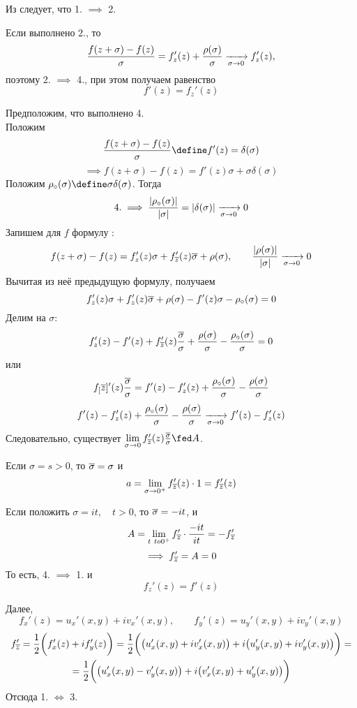 \begin{iproof}
	\item Из  следует, что 1. $ \implies $ 2.
	\item Если выполнено 2., то
	$$ \frac{f(z + \sigma) - f(z)}\sigma = f_z'(z) + \frac{\rho(\sigma)}\sigma \xrightarrow[\sigma \to 0]{} f_z'(z), $$
	поэтому 2. $ \implies $ 4., при этом получаем равенство
	$$ f'(z) = f_z'(z) $$
	\item Предположим, что выполнено 4. \\
	Положим
	$$ \frac{f(z + \sigma) - f(z)}\sigma \define f'(z) = \delta(\sigma) $$
	$$ \implies f(z + \sigma) - f(z) = f'(z) \sigma + \sigma \delta(\sigma) $$
	Положим $ \rho_\circ(\sigma) \define \sigma\delta(\sigma) $. Тогда
	$$ 4. \implies \frac{|\rho_\circ(\sigma)|}{|\sigma|} = |\delta(\sigma)| \xrightarrow[\sigma \to 0]{} 0 $$
	Запишем для $ f $ формулу :
	$$ f(z + \sigma) - f(z) = f_z'(z)\sigma + f_{\overline z}'(z) \overline \sigma + \rho(\sigma), \qquad \frac{|\rho(\sigma)|}{|\sigma|} \xrightarrow[\sigma \to 0]{} 0 $$
	Вычитая из неё предыдущую формулу, получаем
	$$ f_z'(z) \sigma + f_z' (z) \overline \sigma + \rho(\sigma) - f'(z)\sigma - \rho_\circ(\sigma) = 0 $$
	Делим на $ \sigma $:
	$$ f_z'(z) - f'(z) + f_{\overline z}'(z) \frac{\overline \sigma}\sigma + \frac{\rho(\sigma)}\sigma - \frac{\rho_\circ(\sigma)}\sigma = 0 $$
	или
	$$ f_[\overline z]'(z) \frac{\overline \sigma}\sigma = f'(z) - f_z'(z) + \frac{\rho_\circ(\sigma)}\sigma - \frac{\rho(\sigma)}\sigma $$
	$$ f'(z) - f_z'(z) + \frac{\rho_\circ(\sigma)}\sigma - \frac{\rho(\sigma)}\sigma \xrightarrow[\sigma \to 0]{} f'(z) - f_z'(z) $$
	Следовательно, существует $ \limz\sigma f_{\ol z}'(z) \frac{\ol \sigma}\sigma \fed A $.

	Если $ \sigma = s > 0 $, то $ \overline \sigma = \sigma $ и
	$$ a = \lim\limits_{\sigma \to 0^+} f_{\overline z}'(z) \cdot 1 = f_{\overline z}'(z) $$

	Если положить $ \sigma = it, \quad t > 0 $, то $ \overline \sigma = -it $, и
	$$ A = \lim\limits_{t\ to 0^+} f_{\overline z}' \cdot \frac{-it}{it} = -f_{\overline z}' $$
	$$ \implies f_{\overline z}' = A = 0 $$
	То есть, 4. $ \implies $ 1. и
	$$ f_z'(z) = f'(z) $$

	\item Далее,
	$$ f_x'(z) = u_x'(x, y) + iv_x'(x, y), \qquad f_y'(z) = u_y'(x, y) + iv_y'(x, y) $$
	\begin{multline*}
		f_{\overline z}' = \frac12 \bigg( f_x'(z) + if_y'(z) \bigg) = \frac12 \bigg( \big( u_x'(x, y) + iv_x'(x, y) \big) + i \big( u_y'(x, y) + iv_y'(x, y) \big) \bigg) = \\
		= \frac12 \bigg( \big( u_x'(x, y) - v_y'(x, y) \big) + i \big( v_x'(x, y) + u_y'(x, y) \big) \bigg)
	\end{multline*}
	Отсюда 1. $ \iff $ 3.
\end{iproof}

